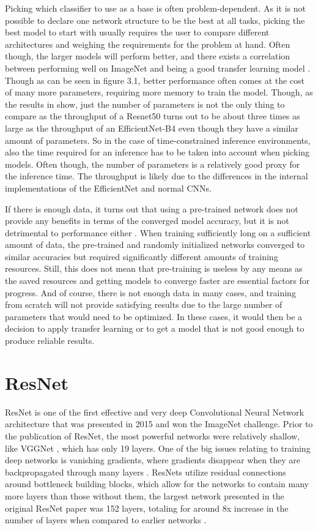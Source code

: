 Picking which classifier to use as a base is often problem-dependent. As it is not possible to declare one network structure to be the best at all tasks, picking the best model to start with usually requires the user to compare different architectures and weighing the requirements for the problem at hand. Often though, the larger models will perform better, and there exists a correlation between performing well on ImageNet and being a good transfer learning model \citep{betterTransfer}. Though as can be seen in figure 3.1, better performance often comes at the cost of many more parameters, requiring more memory to train the model. Though, as the results in \citep{classifierPerformance} show, just the number of parameters is not the only thing to compare as the throughput of a Resnet50 turns out to be about three times as large as the throughput of an EfficientNet-B4 \citep{efficientNet} even though they have a similar amount of parameters. So in the case of time-constrained inference environments, also the time required for an inference has to be taken into account when picking models.
Often though, the number of parameters is a relatively good proxy for the inference time.
The throughput is likely due to the differences in the internal implementations of the EfficientNet and normal CNNs.

If there is enough data, it turns out that using a pre-trained network does not provide any benefits in terms of the converged model accuracy, but it is not detrimental to performance either \citep{rethinkTransfer}. When training sufficiently long on a sufficient amount of data, the pre-trained and randomly initialized networks converged to similar accuracies but required significantly different amounts of training resources. Still, this does not mean that pre-training is useless by any means as the saved resources and getting models to converge faster are essential factors for progress. And of course, there is not enough data in many cases, and training from scratch will not provide satisfying results due to the large number of parameters that would need to be optimized.
In these cases, it would then be a decision to apply transfer learning or to get a model that is not good enough to produce reliable results.

\section{ResNet}
ResNet is one of the first effective and very deep Convolutional Neural Network architecture that was presented in 2015 and won the ImageNet challenge. Prior to the publication of ResNet, the most powerful networks were relatively shallow, like VGGNet \citep{VGG}, which has only 19 layers. One of the big issues relating to training deep networks is vanishing gradients, where gradients disappear when they are backpropagated through many layers \citep{wideResNet}. ResNets utilize residual connections around bottleneck building blocks, which allow for the networks to contain many more layers than those without them, the largest network presented in the original ResNet paper was 152 layers, totaling for around 8x increase in the number of layers when compared to earlier networks \citep{resNet}.

